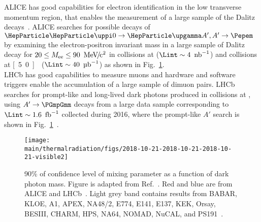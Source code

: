 \documentclass[../report.tex]{subfiles}
\providecommand{\main}{..}
\begin{document}

ALICE has good capabilities for electron identification in the low 
transverse momentum region, that enables the measurement of a large sample of 
the \PGpz Dalitz decays~\cite{Acharya:2018ohw}. 
ALICE searches for possible decays of 
$\PGpz \rightarrow \PGg A', A' \rightarrow \Pepem$ 
by examining the electron-positron invariant mass in a large sample
of \PGpz Dalitz decay for $20 \le M_{\rm ee} \le \unit[90]{\UMeVcc}$ in 
\pp{} collisions at \unit[7]{\UTeV} ($\Lint \sim \unit[4]{\Unb^{-1}}$) and 
\pPb{} collisions at \unit[5.0]{\UTeV} ($\Lint \sim \unit[40]{\Uub^{-1}}$) as shown in 
Fig.~\ref{fig:darkphoton_alice_lhcb}.\\
LHCb has good capabilities to measure muons and hardware and software 
triggers enable the accumulation of a large sample of dimuon pairs. 
LHCb searches for prompt-like and long-lived dark photons 
produced in \pp{} collisions at \unit[13]{\UTeV}, using $A' \rightarrow \PGmpGmm$ decays 
from a large data sample corresponding to $\Lint \sim \unit[1.6]{\Ufb^{-1}}$ 
collected during 2016, where 
the prompt-like $A'$ search is shown in Fig.~\ref{fig:darkphoton_alice_lhcb}~\cite{Aaij:2017rft}.

\begin{figure}[htbp]
\begin{center}
\texttt{[image: \\main/thermalradiation/figs/2018-10-21-2018-10-21-2018-10-21-visible2]}
\end{center}
\caption{90\% of confidence level of mixing parameter as a function of dark photon mass. Figure is adapted from Ref.~\cite{Ilten:2018crw}. 
Red and blue are from ALICE and LHCb~\cite{Aaij:2017rft}. 
Light grey band contains results from BABAR, KLOE, A1, APEX, NA48/2,  E774, E141, E137, KEK, Orsay, BESIII, CHARM, HPS, NA64, NOMAD, NuCAL, and PS191~\cite{Ilten:2018crw}.}
\label{fig:darkphoton_alice_lhcb}
\end{figure}
 
\end{document}
